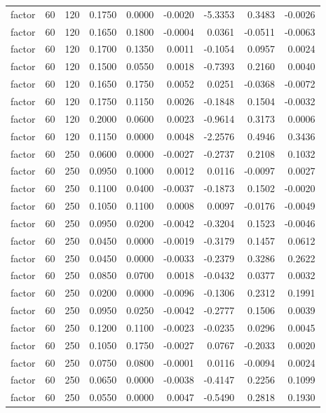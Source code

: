 \begin{tabular}{lrrrrrrrr}
factor & 60 & 120 & 0.1750 & 0.0000 & -0.0020 & -5.3353 & 0.3483 & -0.0026 \\
factor & 60 & 120 & 0.1650 & 0.1800 & -0.0004 & 0.0361 & -0.0511 & -0.0063 \\
factor & 60 & 120 & 0.1700 & 0.1350 & 0.0011 & -0.1054 & 0.0957 & 0.0024 \\
factor & 60 & 120 & 0.1500 & 0.0550 & 0.0018 & -0.7393 & 0.2160 & 0.0040 \\
factor & 60 & 120 & 0.1650 & 0.1750 & 0.0052 & 0.0251 & -0.0368 & -0.0072 \\
factor & 60 & 120 & 0.1750 & 0.1150 & 0.0026 & -0.1848 & 0.1504 & -0.0032 \\
factor & 60 & 120 & 0.2000 & 0.0600 & 0.0023 & -0.9614 & 0.3173 & 0.0006 \\
factor & 60 & 120 & 0.1150 & 0.0000 & 0.0048 & -2.2576 & 0.4946 & 0.3436 \\
factor & 60 & 250 & 0.0600 & 0.0000 & -0.0027 & -0.2737 & 0.2108 & 0.1032 \\
factor & 60 & 250 & 0.0950 & 0.1000 & 0.0012 & 0.0116 & -0.0097 & 0.0027 \\
factor & 60 & 250 & 0.1100 & 0.0400 & -0.0037 & -0.1873 & 0.1502 & -0.0020 \\
factor & 60 & 250 & 0.1050 & 0.1100 & 0.0008 & 0.0097 & -0.0176 & -0.0049 \\
factor & 60 & 250 & 0.0950 & 0.0200 & -0.0042 & -0.3204 & 0.1523 & -0.0046 \\
factor & 60 & 250 & 0.0450 & 0.0000 & -0.0019 & -0.3179 & 0.1457 & 0.0612 \\
factor & 60 & 250 & 0.0450 & 0.0000 & -0.0033 & -0.2379 & 0.3286 & 0.2622 \\
factor & 60 & 250 & 0.0850 & 0.0700 & 0.0018 & -0.0432 & 0.0377 & 0.0032 \\
factor & 60 & 250 & 0.0200 & 0.0000 & -0.0096 & -0.1306 & 0.2312 & 0.1991 \\
factor & 60 & 250 & 0.0950 & 0.0250 & -0.0042 & -0.2777 & 0.1506 & 0.0039 \\
factor & 60 & 250 & 0.1200 & 0.1100 & -0.0023 & -0.0235 & 0.0296 & 0.0045 \\
factor & 60 & 250 & 0.1050 & 0.1750 & -0.0027 & 0.0767 & -0.2033 & 0.0020 \\
factor & 60 & 250 & 0.0750 & 0.0800 & -0.0001 & 0.0116 & -0.0094 & 0.0024 \\
factor & 60 & 250 & 0.0650 & 0.0000 & -0.0038 & -0.4147 & 0.2256 & 0.1099 \\
factor & 60 & 250 & 0.0550 & 0.0000 & 0.0047 & -0.5490 & 0.2818 & 0.1930 \\

\end{tabular}
